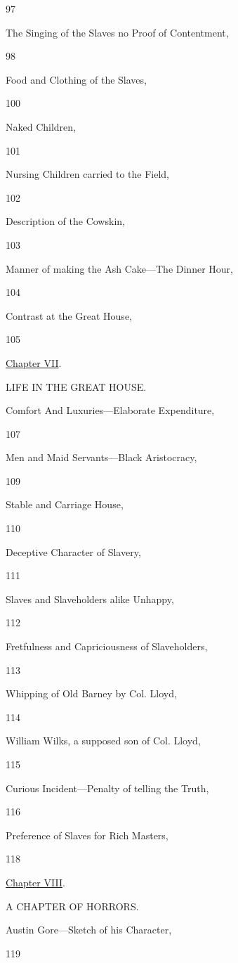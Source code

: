 97

The Singing of the Slaves no Proof of Contentment,

98

Food and Clothing of the Slaves,

100

Naked Children,

101

Nursing Children carried to the Field,

102

Description of the Cowskin,

103

Manner of making the Ash Cake---The Dinner Hour,

104

Contrast at the Great House,

105

\href{/wiki/My_Bondage_and_My_Freedom_(1855)/Chapter_VII}{Chapter VII}.

LIFE IN THE GREAT HOUSE.

Comfort And Luxuries---Elaborate Expenditure,

107

Men and Maid Servants---Black Aristocracy,

109

Stable and Carriage House,

110

Deceptive Character of Slavery,

111

Slaves and Slaveholders alike Unhappy,

112

Fretfulness and Capriciousness of Slaveholders,

113

Whipping of Old Barney by Col. Lloyd,

114

William Wilks, a supposed son of Col. Lloyd,

115

Curious Incident---Penalty of telling the Truth,

116

Preference of Slaves for Rich Masters,

118

\href{/wiki/My_Bondage_and_My_Freedom_(1855)/Chapter_VIII}{Chapter
VIII}.

A CHAPTER OF HORRORS.

Austin Gore---Sketch of his Character,

119

